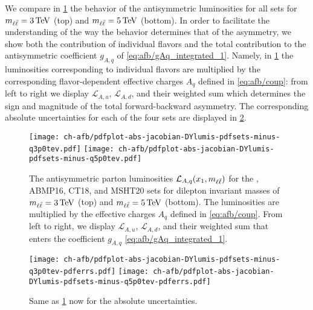 We compare
in \cref{fig:afb/mll_dep_lumi_minus}
the behavior of the antisymmetric luminosities for all \pdf
sets for $\mll=\SI{3}{\tera\electronvolt}$ (top) and $\mll=\SI{5}{\tera\electronvolt}$ (bottom).
%
In order to facilitate the understanding of the way the \pdf behavior
determines that of the asymmetry, we show both the contribution of
individual flavors and the total contribution
to the antisymmetric coefficient $g_{A,q}$ of
\cref{eq:afb/gAq_integrated_1}. Namely, in
\cref{fig:afb/mll_dep_lumi_minus} the luminosities corresponding to
individual flavors are multiplied by the corresponding flavor-dependent
effective charges $A_q$ defined in \cref{eq:afb/coup}:
from left to right we display $\mathcal{L}_{A,u}$,  $\mathcal{L}_{A,d}$,
and their weighted sum
 which determines
the sign and magnitude of the total forward-backward asymmetry.
%
The corresponding absolute \pdf uncertainties for each of the four \pdf sets
are displayed in  \cref{fig:afb/mll_dep_lumi_minus_pdferrs}.

\begin{figure}[!t]
 \centering
 \texttt{[image: ch-afb/pdfplot-abs-jacobian-DYlumis-pdfsets-minus-q3p0tev.pdf]}
 \texttt{[image: ch-afb/pdfplot-abs-jacobian-DYlumis-pdfsets-minus-q5p0tev.pdf]}
 \caption{The antisymmetric 
   parton luminosities $\mathcal{L}_{A,q}(x_1,m_{\ell\bar{\ell}})$ for the , ABMP16,
   CT18, and MSHT20 \nnlo \pdf sets for dilepton
   invariant masses of
   $\mll=\SI{3}{\tera\electronvolt}$ (top) and $\mll=\SI{5}{\tera\electronvolt}$ (bottom).
   The luminosities are multiplied by the effective charges
   $A_q$ defined in \cref{eq:afb/coup}.
   From left to right, we display $\mathcal{L}_{A,u}$,  $\mathcal{L}_{A,d}$,
   and their weighted sum that enters the  coefficient $g_{A,q}$ \cref{eq:afb/gAq_integrated_1}.
    }    
 \label{fig:afb/mll_dep_lumi_minus}
\end{figure}

\begin{figure}[!t]
 \centering
 \texttt{[image: ch-afb/pdfplot-abs-jacobian-DYlumis-pdfsets-minus-q3p0tev-pdferrs.pdf]}
 \texttt{[image: ch-afb/pdfplot-abs-jacobian-DYlumis-pdfsets-minus-q5p0tev-pdferrs.pdf]}
 \caption{Same as \cref{fig:afb/mll_dep_lumi_minus} now for the absolute \pdf uncertainties.
    }    
 \label{fig:afb/mll_dep_lumi_minus_pdferrs}
\end{figure}

